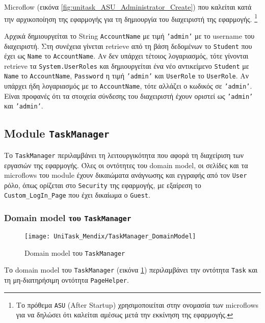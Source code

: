                     Microflow (εικόνα \ref{fig:unitask_ASU_Administrator_Create}) που καλείται κατά την αρχικοποίηση της εφαρμογής για τη δημιουργία του διαχειριστή της εφαρμογής. \footnote{Το πρόθεμα \texttt{ASU} (After Startup) χρησιμοποιείται στην ονομασία των microflows για να δηλώσει ότι καλείται αμέσως μετά την εκκίνηση της εφαρμογής.}

                    Αρχικά δημιουργείται το String \texttt{AccountName} με τιμή \texttt{'admin'} με το username του διαχειριστή. Στη συνέχεια γίνεται retrieve από τη βάση δεδομένων το \texttt{Student} που έχει ως \texttt{Name} το \texttt{AccountName}. Αν δεν υπάρχει τέτοιος λογαριασμός, τότε γίνονται retrieve τα \texttt{System.UserRoles} και δημιουργείται ένα νέο αντικείμενο \texttt{Student} με \texttt{Name} το \texttt{AccountName}, \texttt{Password} η τιμή \texttt{'admin'} και \texttt{UserRole} το \texttt{UserRole}. Αν υπάρχει ήδη λογαριασμός με το \texttt{AccountName}, τότε αλλάζει ο κωδικός σε \texttt{'admin'}. Είναι προφανές ότι τα στοιχεία σύνδεσης του διαχειριστή έχουν οριστεί ως \texttt{'admin'} και \texttt{'admin'}.

        \subsection{Module \texttt{TaskManager}}
            Το \texttt{TaskManager} περιλαμβάνει τη λειτουργικότητα που αφορά τη διαχείριση των εργασιών της εφαρμογής. Όλες οι οντότητες του domain model, οι σελίδες και τα microflows του module έχουν δικαιώματα ανάγνωσης και εγγραφής από τον \texttt{User} ρόλο, όπως ορίζεται στο \texttt{Security} της εφαρμογής, με εξαίρεση το \texttt{Custom\_LogIn\_Page} που έχει δικαίωμα ο \texttt{Guest}.

            \subsubsection{Domain model του \texttt{TaskManager}}
                \begin{figure}[H] \noindent \centering
                    \texttt{[image: UniTask\_Mendix/TaskManager\_DomainModel]}
                    \caption{\centering Domain model του \texttt{TaskManager}}
                    \label{fig:unitask_TaskManager_DomainModel}
                \end{figure}

                Το domain model του \texttt{TaskManager} (εικόνα \ref{fig:unitask_TaskManager_DomainModel}) περιλαμβάνει την οντότητα \texttt{Task} και τη μη-διατηρήσιμη οντότητα \texttt{PageHelper}.


